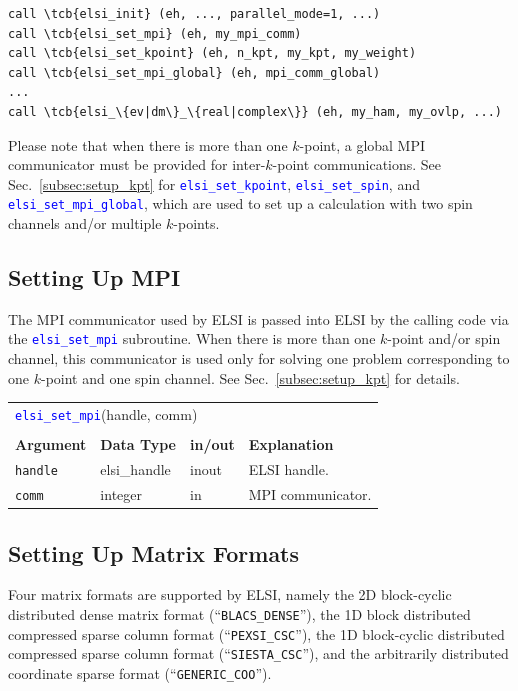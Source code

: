 \documentclass{report}
\newcommand{\tcb}[1]{\textcolor{blue}{#1}}
\newcommand{\api}[1]{\textcolor{blue}{\texttt{#1}}}
\begin{document}
\begin{tcolorbox}
\begin{Verbatim}[commandchars=\\\{\}]
call \tcb{elsi_init} (eh, ..., parallel_mode=1, ...)
call \tcb{elsi_set_mpi} (eh, my_mpi_comm)
call \tcb{elsi_set_kpoint} (eh, n_kpt, my_kpt, my_weight)
call \tcb{elsi_set_mpi_global} (eh, mpi_comm_global)
...
call \tcb{elsi_\{ev|dm\}_\{real|complex\}} (eh, my_ham, my_ovlp, ...)
\end{Verbatim}
\end{tcolorbox}

Please note that when there is more than one $k$-point, a global MPI communicator must be provided for inter-$k$-point communications. See Sec.~\ref{subsec:setup_kpt} for \api{elsi\_set\_kpoint}, \api{elsi\_set\_spin}, and \api{elsi\_set\_mpi\_global}, which are used to set up a calculation with two spin channels and/or multiple $k$-points.

\subsection{Setting Up MPI}
\label{subsec:setup_mpi}
The MPI communicator used by ELSI is passed into ELSI by the calling code via the \api{elsi\_set\_mpi} subroutine. When there is more than one $k$-point and/or spin channel, this communicator is used only for solving one problem corresponding to one $k$-point and one spin channel. See Sec.~\ref{subsec:setup_kpt} for details.

\begin{tabular}[]{|p{20mm}|p{20mm}|p{10mm}|p{112mm}|}
\multicolumn{4}{l}{\api{elsi\_set\_mpi}(handle, comm)}\\
\multicolumn{4}{l}{}\\
\hline
\multicolumn{1}{|l|}{\textbf{Argument}} & \multicolumn{1}{l|}{\textbf{Data Type}} & \multicolumn{1}{l|}{\textbf{in/out}} & \multicolumn{1}{l|}{\textbf{Explanation}}\\
\hline
\texttt{handle} & elsi\_handle & inout & ELSI handle.\\
\hline
\texttt{comm}   & integer      & in    & MPI communicator.\\
\hline
\end{tabular}

\subsection{Setting Up Matrix Formats}
\label{subsec:setup_matrix}
Four matrix formats are supported by ELSI, namely the 2D block-cyclic distributed dense matrix format (``\texttt{BLACS\_DENSE}''), the 1D block distributed compressed sparse column format (``\texttt{PEXSI\_CSC}''), the 1D block-cyclic distributed compressed sparse column format (``\texttt{SIESTA\_CSC}''), and the arbitrarily distributed coordinate sparse format (``\texttt{GENERIC\_COO}'').
\end{document}
